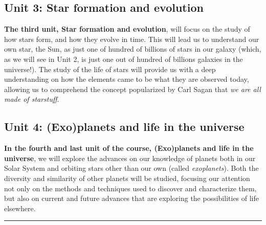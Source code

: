 \documentclass{tufte-handout}
\begin{document}
\begin{fullwidth}
\subsection{Unit 3: Star formation and evolution}
\textbf{The third unit, {\color{red}Star formation and evolution}}, will focus on the study of how stars form, and how they 
evolve in time. This will lead us to understand our own star, the Sun, as just one of hundred of billions of stars in our galaxy (which, as we will 
see in Unit 2, is just one out of hundred of billions galaxies in the universe!). The study of the life of stars will provide us with a deep understanding 
on how the elements came to be what they are observed today, allowing us to comprehend the concept popularized by Carl Sagan that \textit{we are all made of 
starstuff}. 

\subsection{Unit 4: (Exo)planets and life in the universe}
\textbf{In the fourth and last unit of the course, {\color{red}(Exo)planets and life in the universe}}, we will explore the advances on our knowledge 
of planets both in our Solar System and orbiting stars other than our own (called \textit{exoplanets}). Both the diversity and similarity of other 
planets will be studied, focusing our attention not only on the methods and techniques used to discover and characterize them, but also on current 
and future advances that are exploring the possibilities of life elsewhere. 

\end{fullwidth}
\pagebreak
\noindent\textcolor{Red}{\rule{16cm}{3mm}}
\end{document}
